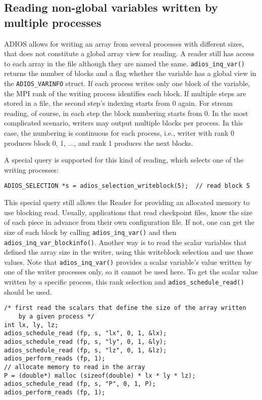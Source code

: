 \subsection{Reading non-global variables written by multiple processes}
\label {section:non_global_vars}
ADIOS allows for writing an array from several processes with different sizes, that does not constitute a global array view for reading. A reader still has access to each array in the file although they are named the same. \verb+adios_inq_var()+ returns the number of blocks and a flag whether the variable has a global view in the \verb+ADIOS_VARINFO+ struct. If each process writes only one block of the variable, the MPI rank of the writing process identifies each block.  If multiple steps are stored in a file, the second step's indexing starts from 0 again. For stream reading, of course, in each step the block numbering starts from 0. In the most complicated scenario, writers may output multiple blocks per process. In this case, the numbering is continuous for each process, i.e., writer with rank 0 produces block 0, 1, ..., and rank 1 produces the next blocks. 

 A special query is supported for this kind of reading, which selects one of the writing processes:

\begin{lstlisting}[frame=none]
ADIOS_SELECTION *s = adios_selection_writeblock(5);  // read block 5 
\end{lstlisting}
 
This special query still allows the Reader for providing an allocated memory to use blocking read. Usually, applications that read checkpoint files, know the size of each piece in advance from their own configuration file. If not, one can get the size of each block by calling \verb+adios_inq_var()+ and then \verb+adios_inq_var_blockinfo()+. Another way is to read the scalar variables that defined the array size in the writer, using this writeblock selection and use those values. Note that \verb+adios_inq_var()+ provides a scalar variable's value written by one of the writer processes only, so it cannot be used here. To get the scalar value written by a specific process, this rank selection and \verb+adios_schedule_read()+ should be used.

\begin{lstlisting}[numbers=none, 
                   caption={Read an array written by one specific process, with first reading the scalars that define the size of the array},  
                   label=code:localread]
/* first read the scalars that define the size of the array written
    by a given process */
int lx, ly, lz;
adios_schedule_read (fp, s, "lx", 0, 1, &lx);
adios_schedule_read (fp, s, "ly", 0, 1, &ly);
adios_schedule_read (fp, s, "lz", 0, 1, &lz);
adios_perform_reads (fp, 1); 
// allocate memory to read in the array
P = (double*) malloc (sizeof(double) * lx * ly * lz);
adios_schedule_read (fp, s, "P", 0, 1, P);
adios_perform_reads (fp, 1);  
\end{lstlisting}


